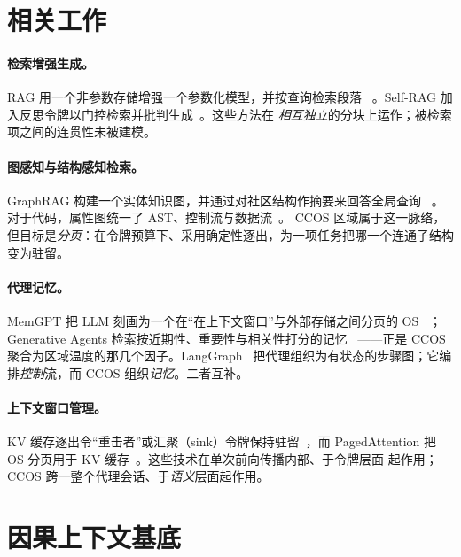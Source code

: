 \documentclass[11pt]{ctexart}
\begin{document}
\section{相关工作}\label{sec:related}

\paragraph{检索增强生成。} RAG 用一个非参数存储增强一个参数化模型，并按查询检索段落
~\cite{lewis2020rag}。Self-RAG 加入反思令牌以门控检索并批判生成~\cite{asai2023selfrag}。这些方法在
\emph{相互独立}的分块上运作；被检索项之间的连贯性未被建模。

\paragraph{图感知与结构感知检索。} GraphRAG 构建一个实体知识图，并通过对社区结构作摘要来回答全局查询
~\cite{edge2024graphrag}。对于代码，属性图统一了 AST、控制流与数据流~\cite{yamaguchi2014cpg}。
CCOS 区域属于这一脉络，但目标是\emph{分页}：在令牌预算下、采用确定性逐出，为一项任务把哪一个连通子结构
变为驻留。

\paragraph{代理记忆。} MemGPT 把 LLM 刻画为一个在“在上下文窗口”与外部存储之间分页的 OS
~\cite{packer2023memgpt}；Generative Agents 检索按近期性、重要性与相关性打分的记忆
~\cite{park2023generative}——正是 CCOS 聚合为区域温度的那几个因子。LangGraph~\cite{langgraph}
把代理组织为有状态的步骤图；它编排\emph{控制}流，而 CCOS 组织\emph{记忆}。二者互补。

\paragraph{上下文窗口管理。} KV 缓存逐出令“重击者”或汇聚（sink）令牌保持驻留~\cite{liu2023lost}，而
PagedAttention 把 OS 分页用于 KV 缓存~\cite{kwon2023paged}。这些技术在单次前向传播内部、于令牌层面
起作用；CCOS 跨一整个代理会话、于\emph{语义}层面起作用。

\section{因果上下文基底}\label{sec:substrate}
\end{document}
